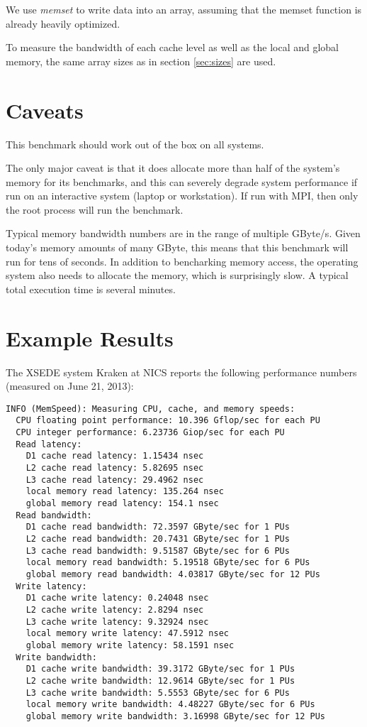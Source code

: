 We use \emph{memset} to write data into an array, assuming that the
memset function is already heavily optimized.

To measure the bandwidth of each cache level as well as the local and
global memory, the same array sizes as in section \ref{sec:sizes} are
used.



\section{Caveats}

This benchmark should work out of the box on all systems.

The only major caveat is that it does allocate more than half of the
system's memory for its benchmarks, and this can severely degrade
system performance if run on an interactive system (laptop or
workstation). If run with MPI, then only the root process will run the
benchmark.

Typical memory bandwidth numbers are in the range of multiple GByte/s.
Given today's memory amounts of many GByte, this means that this
benchmark will run for tens of seconds. In addition to bencharking
memory access, the operating system also needs to allocate the memory,
which is surprisingly slow. A typical total execution time is several
minutes.



\section{Example Results}

The XSEDE system Kraken at NICS reports the following performance
numbers (measured on June 21, 2013):
\begin{verbatim}
INFO (MemSpeed): Measuring CPU, cache, and memory speeds:
  CPU floating point performance: 10.396 Gflop/sec for each PU
  CPU integer performance: 6.23736 Giop/sec for each PU
  Read latency:
    D1 cache read latency: 1.15434 nsec
    L2 cache read latency: 5.82695 nsec
    L3 cache read latency: 29.4962 nsec
    local memory read latency: 135.264 nsec
    global memory read latency: 154.1 nsec
  Read bandwidth:
    D1 cache read bandwidth: 72.3597 GByte/sec for 1 PUs
    L2 cache read bandwidth: 20.7431 GByte/sec for 1 PUs
    L3 cache read bandwidth: 9.51587 GByte/sec for 6 PUs
    local memory read bandwidth: 5.19518 GByte/sec for 6 PUs
    global memory read bandwidth: 4.03817 GByte/sec for 12 PUs
  Write latency:
    D1 cache write latency: 0.24048 nsec
    L2 cache write latency: 2.8294 nsec
    L3 cache write latency: 9.32924 nsec
    local memory write latency: 47.5912 nsec
    global memory write latency: 58.1591 nsec
  Write bandwidth:
    D1 cache write bandwidth: 39.3172 GByte/sec for 1 PUs
    L2 cache write bandwidth: 12.9614 GByte/sec for 1 PUs
    L3 cache write bandwidth: 5.5553 GByte/sec for 6 PUs
    local memory write bandwidth: 4.48227 GByte/sec for 6 PUs
    global memory write bandwidth: 3.16998 GByte/sec for 12 PUs
\end{verbatim}

